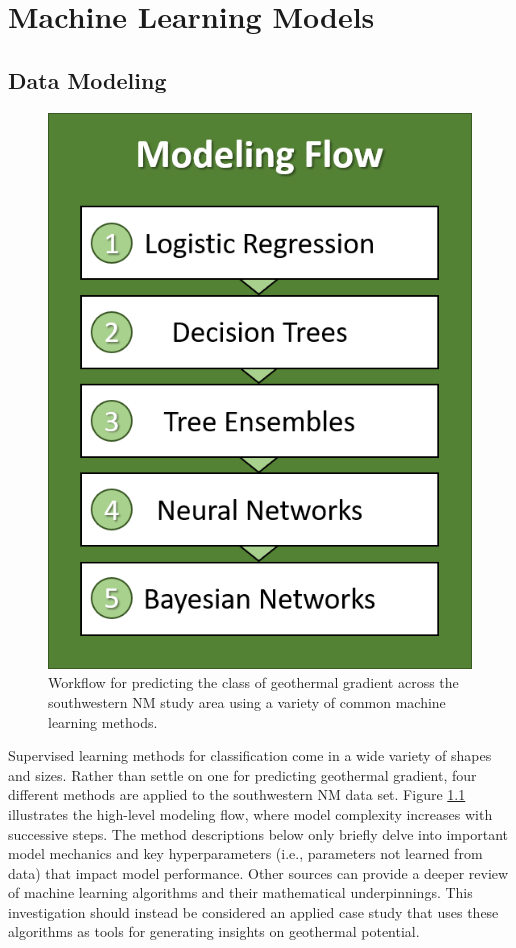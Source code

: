 \chapter{Machine Learning Models}\label{ch5:expl_applied}

\section{Data Modeling}

\begin{figure}
\centering
\includegraphics[scale=.6]{templates/images/Flow-Modeling.png}
\singlespacing
\caption[Modeling workflow]{Workflow for predicting the class of geothermal gradient across the southwestern NM study area using a variety of common machine learning methods.}
\label{fig:model_flow}
\end{figure}

Supervised learning methods for classification come in a wide variety of shapes and sizes. Rather than settle on one for predicting geothermal gradient, four different methods are applied to the southwestern NM data set. Figure \ref{fig:model_flow} illustrates the high-level modeling flow, where model complexity increases with successive steps. The method descriptions below only briefly delve into important model mechanics and key hyperparameters (i.e., parameters not learned from data) that impact model performance. Other sources can provide a deeper review of machine learning algorithms and their mathematical underpinnings. This investigation should instead be considered an applied case study that uses these algorithms as tools for generating insights on geothermal potential. 

